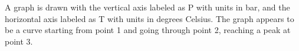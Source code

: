 A graph is drawn with the vertical axis labeled as P with units in bar, and the horizontal axis labeled as T with units in degrees Celsius. The graph appears to be a curve starting from point 1 and going through point 2, reaching a peak at point 3.